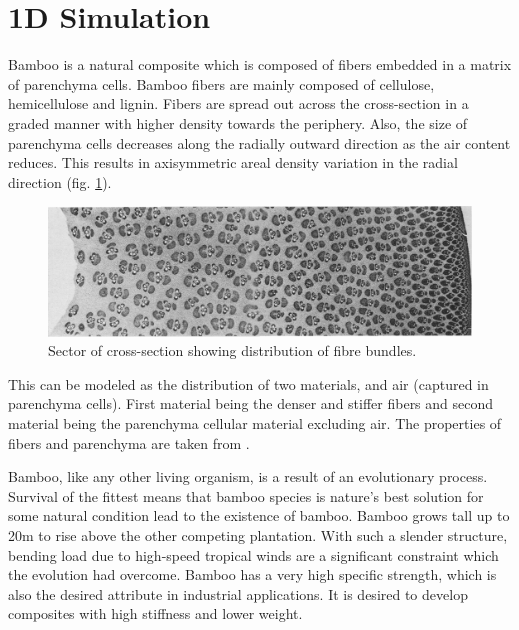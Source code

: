 \documentclass[10pt]{article}
\begin{document}
\section{1D Simulation}
Bamboo is a natural composite which is composed of fibers embedded in a matrix of parenchyma cells. Bamboo fibers are mainly composed of cellulose, hemicellulose and lignin.\cite{mwaikambo2006review} Fibers are spread out across the cross-section in a graded manner with higher density towards the periphery. Also, the size of parenchyma cells decreases along the radially outward direction as the air content reduces. This results in axisymmetric areal density variation in the radial direction (fig. \ref{fig:fibrebundle}).
\begin{figure}[H]
\begin{center}
\includegraphics[scale=.35]{./Plots/normal/radialfibers.png}
\caption{Sector of cross-section showing distribution of fibre bundles. \cite{grosser1971anatomy}}
\label{fig:fibrebundle}
\end{center}
\end{figure}
This can be modeled as the distribution of two materials, and air (captured in parenchyma cells). First material being the denser and stiffer fibers and second material being the parenchyma cellular material excluding air. The properties of fibers and parenchyma are taken from \cite{mannan2018stiffness}\cite{mwaikambo2006review}. \par
Bamboo, like any other living organism, is a result of an evolutionary process. Survival of the fittest means that bamboo species is nature's best solution for some natural condition lead to the existence of bamboo. Bamboo grows tall up to 20m to rise above the other competing plantation. With such a slender structure, bending load due to high-speed tropical winds are a significant constraint which the evolution had overcome. Bamboo has a very high specific strength, which is also the desired attribute in industrial applications. It is desired to develop composites with high stiffness and lower weight.\par 
\end{document}
